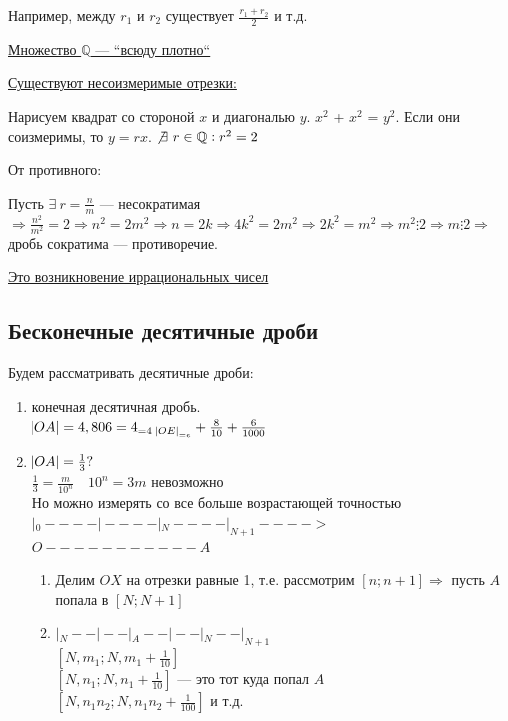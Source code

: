\documentclass{article}
\begin{document}
            Например, между $r_1$ и $r_2$ существует $\frac{r_1 + r_2}{2}$ и т.д.

            \underline{Множество $\mathbb{Q}$ --- ``всюду плотно``} 

            \underline{Существуют несоизмеримые отрезки:}

            Нарисуем квадрат со стороной $x$ и диагональю $y$.
            $x^2$ + $x^2$ = $y^2$.
            Если они соизмеримы, то $y = rx$.
            $\not\exists\ r \in \mathbb{Q}: r^2 = 2$

            От противного:

            Пусть $\exists\ r = \frac{n}{m}$ --- несократимая $\Rightarrow \frac{n^2}{m^2} = 2 \Rightarrow n^2 = 2m^2 \Rightarrow n = 2k \Rightarrow 4k^2 = 2m^2 \Rightarrow 2k^2 = m^2 \Rightarrow m^2 \vdots 2 \Rightarrow m \vdots 2 \Rightarrow$ дробь сократима --- противоречие.

            \underline{Это возникновение иррациональных чисел}

        \subsection{Бесконечные десятичные дроби}
            Будем рассматривать десятичные дроби:
            \begin{enumerate}
                \item конечная десятичная дробь.\\
                $\abs{OA} = 4,806 = 4_{= 4\ \abs{OE}_{= e}} + \frac{8}{10} + \frac{6}{1000}$\\
                \item $\abs{OA} = \frac{1}{3}?$\\
                $\frac{1}{3} = \frac{m}{10^n} \quad 10^n = 3m$ невозможно\\
                Но можно измерять со все больше возрастающей точностью\\
                $|_{0}----|----|_{N}----|_{N+1}---->$\\
                $O-----------A$\\
                \begin{enumerate}[1.]
                    \item Делим $OX$ на отрезки равные 1, т.е. рассмотрим $[n; n+1] \Rightarrow$ пусть $A$ попала в $[N; N+1]$
                    \item $|_{N}--|--|_{A}--|--|_{N}--|_{N+1}$\\
                    $[N,m_1;N,m_1 + \frac{1}{10}]$\\
                    $[N,n_1;N,n_1 + \frac{1}{10}]$ --- это тот куда попал $A$\\
                    $[N,n_1n_2;N,n_1n_2 + \frac{1}{100}]$ и т.д.\\
                \end{enumerate}
            \end{enumerate}
\end{document}
